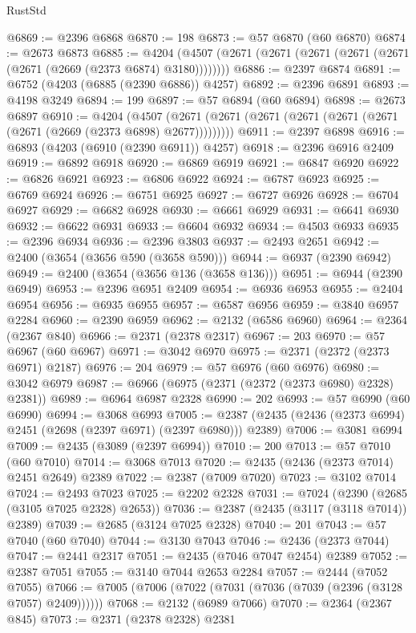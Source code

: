 \begin{lexlean}{RustStd}
\begin{coremodule}
@6869 := @2396 @6868
@6870 := 198
@6873 := @57 @6870 (@60 @6870)
@6874 := @2673 @6873
@6885 := @4204 (@4507 (@2671 (@2671 (@2671 (@2671 (@2671 (@2671 (@2669 (@2373 @6874) @3180))))))))
@6886 := @2397 @6874
@6891 := @6752 (@4203 (@6885 (@2390 @6886)) @4257)
@6892 := @2396 @6891
@6893 := @4198 @3249
@6894 := 199
@6897 := @57 @6894 (@60 @6894)
@6898 := @2673 @6897
@6910 := @4204
    (@4507 (@2671 (@2671 (@2671 (@2671 (@2671 (@2671 (@2671 (@2669 (@2373 @6898) @2677)))))))))
@6911 := @2397 @6898
@6916 := @6893 (@4203 (@6910 (@2390 @6911)) @4257)
@6918 := @2396 @6916 @2409
@6919 := @6892 @6918
@6920 := @6869 @6919
@6921 := @6847 @6920
@6922 := @6826 @6921
@6923 := @6806 @6922
@6924 := @6787 @6923
@6925 := @6769 @6924
@6926 := @6751 @6925
@6927 := @6727 @6926
@6928 := @6704 @6927
@6929 := @6682 @6928
@6930 := @6661 @6929
@6931 := @6641 @6930
@6932 := @6622 @6931
@6933 := @6604 @6932
@6934 := @4503 @6933
@6935 := @2396 @6934
@6936 := @2396 @3803
@6937 := @2493 @2651
@6942 := @2400 (@3654 (@3656 @590 (@3658 @590)))
@6944 := @6937 (@2390 @6942)
@6949 := @2400 (@3654 (@3656 @136 (@3658 @136)))
@6951 := @6944 (@2390 @6949)
@6953 := @2396 @6951 @2409
@6954 := @6936 @6953
@6955 := @2404 @6954
@6956 := @6935 @6955
@6957 := @6587 @6956
@6959 := @3840 @6957 @2284
@6960 := @2390 @6959
@6962 := @2132 (@6586 @6960)
@6964 := @2364 (@2367 @840)
@6966 := @2371 (@2378 @2317)
@6967 := 203
@6970 := @57 @6967 (@60 @6967)
@6971 := @3042 @6970
@6975 := @2371 (@2372 (@2373 @6971) @2187)
@6976 := 204
@6979 := @57 @6976 (@60 @6976)
@6980 := @3042 @6979
@6987 := @6966 (@6975 (@2371 (@2372 (@2373 @6980) @2328) @2381))
@6989 := @6964 @6987 @2328
@6990 := 202
@6993 := @57 @6990 (@60 @6990)
@6994 := @3068 @6993
@7005 := @2387 (@2435 (@2436 (@2373 @6994) @2451 (@2698 (@2397 @6971) (@2397 @6980))) @2389)
@7006 := @3081 @6994
@7009 := @2435 (@3089 (@2397 @6994))
@7010 := 200
@7013 := @57 @7010 (@60 @7010)
@7014 := @3068 @7013
@7020 := @2435 (@2436 (@2373 @7014) @2451 @2649) @2389
@7022 := @2387 (@7009 @7020)
@7023 := @3102 @7014
@7024 := @2493 @7023
@7025 := @2202 @2328
@7031 := @7024 (@2390 (@2685 (@3105 @7025 @2328) @2653))
@7036 := @2387 (@2435 (@3117 (@3118 @7014)) @2389)
@7039 := @2685 (@3124 @7025 @2328)
@7040 := 201
@7043 := @57 @7040 (@60 @7040)
@7044 := @3130 @7043
@7046 := @2436 (@2373 @7044)
@7047 := @2441 @2317
@7051 := @2435 (@7046 @7047 @2454) @2389
@7052 := @2387 @7051
@7055 := @3140 @7044 @2653 @2284
@7057 := @2444 (@7052 @7055)
@7066 := @7005 (@7006 (@7022 (@7031 (@7036 (@7039 (@2396 (@3128 @7057) @2409))))))
@7068 := @2132 (@6989 @7066)
@7070 := @2364 (@2367 @845)
@7073 := @2371 (@2378 @2328) @2381

\end{coremodule}
\end{lexlean}
